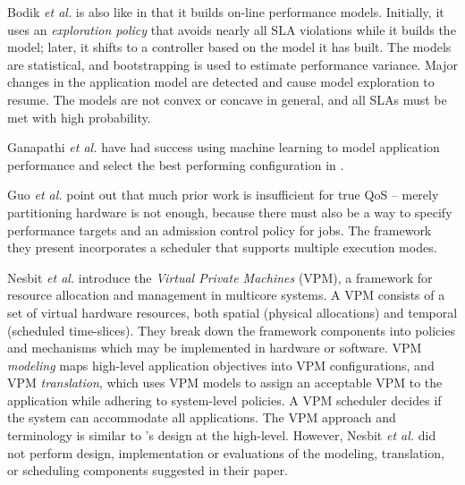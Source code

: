 Bodik \emph{et al.}\cite{bodik-acdc09} is also like \pacora in that it builds on-line performance models.
Initially, it uses an \emph{exploration policy} that avoids nearly all SLA violations while it builds the model;
later, it shifts to a controller based on the model it has built.
The models are statistical, and bootstrapping is used to estimate performance variance.
Major changes in the application model are detected and cause model exploration to resume.
The models are not convex or concave in general, and all SLAs must be met with high probability.

Ganapathi \emph{et al.} have had success using machine learning to model application performance and select the best performing configuration in \cite{Archana}.

Guo \emph{et al.}\cite{1331730} point out that much prior work is insufficient for true QoS -- merely partitioning hardware is not enough, because there must also be a way to specify performance targets and an admission control policy for jobs.
The framework they present incorporates a scheduler that supports multiple execution modes.



Nesbit \emph{et al.}\cite{1436097} introduce the \emph{Virtual Private Machines} (VPM), a framework for resource allocation and management in multicore systems. A VPM consists of a set of virtual hardware resources, both spatial (physical allocations) and temporal (scheduled time-slices).  They break down the framework components into policies and mechanisms which may be implemented in hardware or software. VPM {\em modeling} maps high-level application objectives into VPM configurations, and VPM {\em translation}, which uses VPM models to assign an acceptable VPM to the application while adhering to system-level policies. A VPM scheduler decides if the system can accommodate all applications. The VPM approach and terminology is similar to \pacora's design at the high-level.  However, Nesbit \emph{et al.} did not perform design, implementation or evaluations of the modeling, translation, or scheduling components suggested in their paper.

%












